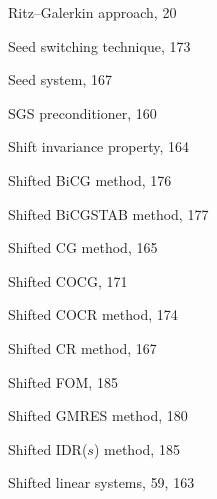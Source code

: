 \begin{description}
{Ritz--Galerkin approach}, {20}\par

\item[S]
{Seed switching technique}, {173}\par

{Seed system}, {167}\par

{SGS preconditioner}, {160}\par

{Shift invariance property}, {164}\par

{Shifted BiCG method}, {176}\par

{Shifted BiCGSTAB method}, {177}\par

{Shifted CG method}, {165}\par

{Shifted COCG}, {171}\par

{Shifted COCR method}, {174}\par

{Shifted CR method}, {167}\par

{Shifted FOM}, {185}\par

{Shifted GMRES method}, {180}\par

{Shifted IDR($s$) method}, {185}\par

{Shifted linear systems}, {59, 163}\par


\end{description}
